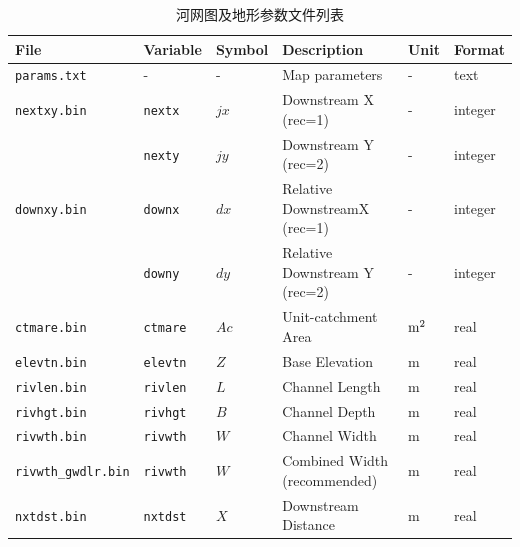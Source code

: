 \begin{table}[htbp]
  \centering
  \caption{河网图及地形参数文件列表}
  \label{tab:河网图及地形参数文件列表}
  \begin{tabular}[h]{p{3.5cm}p{1.5cm}p{1.5cm}p{5cm}p{1cm}p{1cm}}  %
    \toprule
    File                       & Variable        & Symbol             & Description                                  & Unit      & Format  \\ \midrule
    \texttt{params.txt}        & -               & -                  & Map parameters                               & -         & text    \\
    \texttt{nextxy.bin}        & \texttt{nextx}  & $jx$               & Downstream X (rec=1)                         & -         & integer \\
    & \texttt{nexty}  & $jy$               & Downstream Y (rec=2)                         & -         & integer \\
    \texttt{downxy.bin}        & \texttt{downx}  & $dx$               & Relative DownstreamX (rec=1)                 & -         & integer \\
    & \texttt{downy}  & $dy$               & Relative Downstream Y (rec=2)                & -         & integer \\
    \texttt{ctmare.bin}        & \texttt{ctmare} & $Ac$               & Unit-catchment Area                          & $\rm m^2$ & real    \\
    \texttt{elevtn.bin}        & \texttt{elevtn} & $Z$                & Base Elevation                               & m         & real    \\
    \texttt{rivlen.bin}        & \texttt{rivlen} & $L$                & Channel Length                               & m         & real    \\
    \texttt{rivhgt.bin}        & \texttt{rivhgt} & $B$                & Channel Depth                                & m         & real    \\
    \texttt{rivwth.bin}        & \texttt{rivwth} & $W$                & Channel Width                                & m         & real    \\
    \texttt{rivwth\_gwdlr.bin} & \texttt{rivwth} & $W$                & Combined Width (recommended)                 & m         & real    \\
    \texttt{nxtdst.bin}        & \texttt{nxtdst} & $X$                & Downstream Distance                          & m         & real    \\

\end{tabular}
\end{table}
